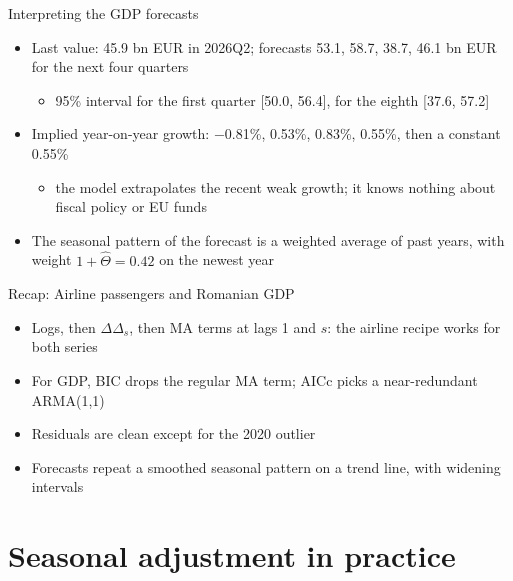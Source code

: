 \begin{frame}{Interpreting the GDP forecasts}
\itemsize{\small}
\begin{itemize}
    \item Last value: 45.9 bn EUR in 2026Q2; forecasts 53.1, 58.7, 38.7, 46.1 bn EUR for the next four quarters
    \begin{itemize}
        \item 95\% interval for the first quarter [50.0, 56.4], for the eighth [37.6, 57.2]
    \end{itemize}
    \item Implied year-on-year growth: \ensuremath{-}0.81\%, 0.53\%, 0.83\%, 0.55\%, then a constant 0.55\%
    \begin{itemize}
        \item the model extrapolates the recent weak growth; it knows nothing about fiscal policy or EU funds
    \end{itemize}
    \item The seasonal pattern of the forecast is a weighted average of past years, with weight $1 + \hat\Theta = 0.42$ on the newest year
\end{itemize}
\end{frame}

\begin{frame}{Recap: Airline passengers and Romanian GDP}
\itemsize{\small}
\begin{itemize}
    \item Logs, then $\Delta\Delta_s$, then MA terms at lags 1 and $s$: the airline recipe works for both series
    \item For GDP, BIC drops the regular MA term; AICc picks a near-redundant ARMA(1,1)
    \item Residuals are clean except for the 2020 outlier
    \item Forecasts repeat a smoothed seasonal pattern on a trend line, with widening intervals
\end{itemize}
\end{frame}


\section{Seasonal adjustment in practice}

